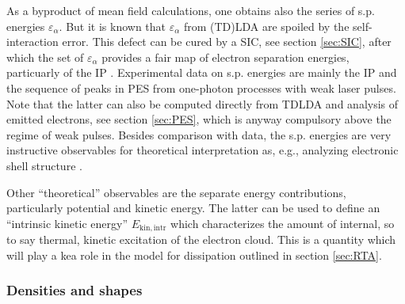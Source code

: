 \documentclass[final,1p]{elsarticle}
\begin{document}
As a byproduct of mean field calculations, one obtains also the series
of s.p. energies $\varepsilon_\alpha$.  But it is known that
$\varepsilon_\alpha$ from (TD)LDA are spoiled by the self-interaction
error. This defect can be cured by a SIC, see section \ref{sec:SIC},
after which the set of $\varepsilon_\alpha$ provides a fair map of
electron separation energies, particuarly of the IP
\cite{Leg02,Klu13}. Experimental data on s.p. energies are mainly the
IP and the sequence of peaks in PES from one-photon processes with
weak laser pulses.  Note that the latter can also be computed directly
from TDLDA and analysis of emitted electrons, see section
\ref{sec:PES}, which is anyway compulsory above the regime of weak
pulses. Besides comparison with data, the s.p. energies are very
instructive observables for theoretical interpretation as, e.g.,
analyzing electronic shell structure \cite{Hee93,Bra93}.

Other ``theoretical'' observables are the separate energy
contributions, particularly potential and kinetic energy.  The latter
can be used to define an ``intrinsic kinetic energy''
$E_\mathrm{kin,intr}$ which characterizes the amount of internal, so
to say thermal, kinetic excitation of the electron cloud. This is a
quantity which will play a kea role in the model for dissipation
outlined in section \ref{sec:RTA}.


\subsubsection{Densities and shapes}
\label{sec:shapes}
\end{document}
